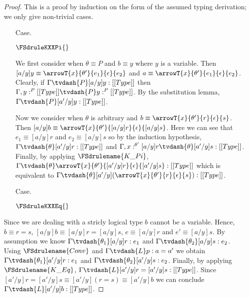 \begin{proof}
  This is a proof by induction on the form of the assumed typing
  derivation; we only give non-trivial cases.
  \begin{itemize}
  \item[Case.] \ \\
    \begin{center}
      $\FSdruleKXXPi{}$
    \end{center}
    We first consider when $\theta \equiv P$ and $b \equiv y$ where $y$ is a variable.  Then
    $[a/y]y \equiv \arrowT{x}{\theta'}{e_1}{\epsilon}{e_2}$ and 
    $a \equiv \arrowT{x}{\theta'}{e_1}{\epsilon}{e_2}$.  Clearly, if 
    $\Gamma \tvdash{P} [a/y]y:[[Type]]$ then $\Gamma, y:^P [[Type]] \tvdash{P} y:^P [[Type]]$.  By
    the substitution lemma, $\Gamma \tvdash{P} [a'/y]y:[[Type]]$.

    Now we consider when $\theta$ is arbitrary and 
    $b \equiv \arrowT{x}{\theta'}{r}{\epsilon}{s}$.
    Then $[a/y]b \equiv \arrowT{x}{\theta'}{[a/y]r}{\epsilon}{[a/y]s}$.  Here we can see that
    $e_1 \equiv [a/y]r$ and $e_2 \equiv [a/y]s$ so by the induction 
    hypothesis, $\Gamma \tvdash{\theta} [a'/y]r:[[Type]]$ and 
    $\Gamma, x:^{\theta'} [a/y]r \tvdash{\theta} [a'/y]s:[[Type]]$.  Finally, by applying 
    $\FSdrulename{K\_Pi}$, 
    $\Gamma \tvdash{\theta} \arrowT{x}{\theta'}{[a'/y]r}{\epsilon}{[a'/y]s}:[[Type]]$ which is 
    equivalent to 
    $\Gamma \tvdash{\theta} [a'/y](\arrowT{x}{\theta'}{r}{\epsilon}{s}):[[Type]]$.
  
  \item[Case.] \ \\
    \begin{center}
      $\FSdruleKXXEq{}$
    \end{center}
  \end{itemize}
  Since we are dealing with a stricly logical type $b$ cannot be a variable.  Hence, 
  $b \equiv r = s$, $[a/y]b \equiv [a/y]r = [a/y]s$, $e \equiv [a/y]r$ and $e' \equiv [a/y]s$.
  By assumption we know $\Gamma \tvdash{\theta_1} [a/y]r:e_1$ and 
  $\Gamma \tvdash{\theta_2} [a/y]s:e_2$.  Using $\FSdrulename{Conv}$ and 
  $\Gamma \tvdash{L} p:a = a'$ we obtain $\Gamma \tvdash{\theta_1} [a'/y]r:e_1$ and 
  $\Gamma \tvdash{\theta_2} [a'/y]s:e_2$.  Finally, by applying $\FSdrulename{K\_Eq}$,
  $\Gamma \tvdash{L} [a'/y]r = [a'/y]s:[[Type]]$.  Since $[a'/y]r = [a'/y]s \equiv 
  [a'/y](r = s) \equiv [a'/y]b$ we can conclude $\Gamma \tvdash{L} [a'/y]b:[[Type]]$.
\end{proof} 
